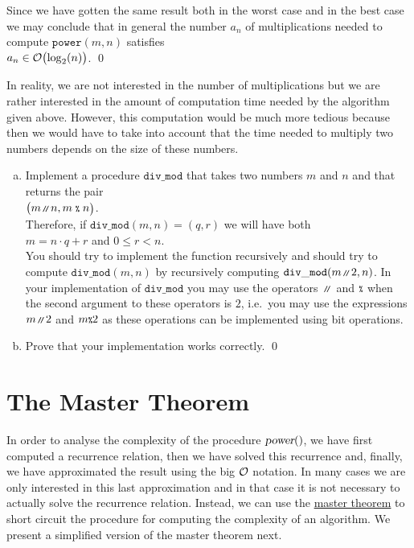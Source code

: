 Since we have gotten the same result both in the worst case and in the best case we may conclude
that in general the number $a_n$ of multiplications needed to compute $\mathtt{power}(m, n)$ satisfies 
\\[0.2cm]
\hspace*{1.3cm} 
$a_n \in \mathcal{O}\bigl(\log_2(n)\bigr)$. \qed

\remark
In reality, we are not interested in the number of multiplications but we are rather interested
in the amount of computation time needed by the algorithm given above.
However, this computation would be much more tedious because then we would have to take into account
that the time needed to multiply two numbers depends on the size of these numbers.

\exercise
\begin{enumerate}[(a)]
\item Implement a procedure $\mathtt{div\_mod}$ that takes two numbers $m$ and $n$ and that returns the pair
      \\[0.2cm]
      \hspace*{1.3cm}
      $\bigl(m \mbox{\scriptsize\,\texttt{/}$\!$\texttt{/}\,} n, m \scriptsize{\;\texttt{\%}\;}n\bigr)$.
      \\[0.2cm]
      Therefore, if $\mathtt{div\_mod}(m, n) = (q,r)$ we will have both
      \\[0.2cm]
      \hspace*{1.3cm}
      $m = n \cdot q + r$ \quad and \quad $0 \leq r < n$.
      \\[0.2cm]
      You should try to implement the function recursively and should try to compute 
      $\mathtt{div\_mod}(m, n)$ by recursively computing $\mathtt{div\_mod}(m \mbox{\scriptsize\,\texttt{/}$\!$\texttt{/}\,} 2, n)$.
      In your implementation of $\mathtt{div\_mod}$ you may use the operators $\mbox{\scriptsize\,\texttt{/}$\!$\texttt{/}\,}$ and
      $\scriptsize{\texttt{\%}}$ when the second argument to these operators is $2$, i.e.~you may
      use the expressions $m \mbox{\scriptsize\,\texttt{/}$\!$\texttt{/}\,} 2$ and $m \scriptsize{\texttt{\%}} 2$ as these operations can be implemented
      using bit operations.
\item Prove that your implementation works correctly.
      \qed
\end{enumerate} 

\section{The Master Theorem}
In order to analyse the complexity of  the procedure $\textsl{power}()$,
we have first computed a  recurrence relation, then we have solved this recurrence and, finally,  
we have approximated the result using the big $\mathcal{O}$ notation.  In many cases we are only interested in this
last approximation and in that case it is not necessary to actually solve the recurrence relation.  
Instead, we can use the 
\href{http://en.wikipedia.org/wiki/Master_theorem#Generic_form}{master theorem} to short 
circuit the procedure for computing the complexity of an algorithm. 
We present a simplified version of the master theorem next.

